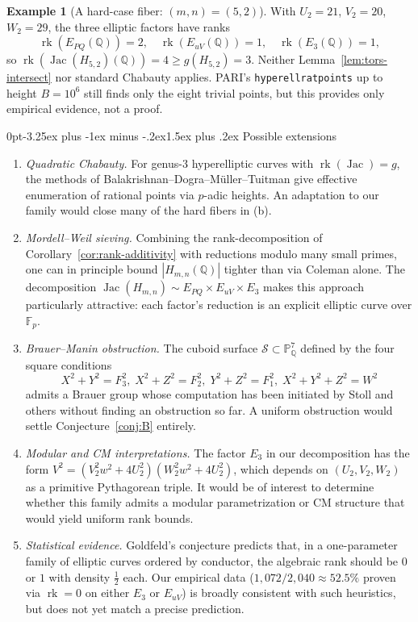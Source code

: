 \documentclass[12pt,a4paper,reqno]{amsart}
\makeatletter
\renewcommand{\subsection}{\@startsection{subsection}{2}%
  {0pt}{-3.25ex plus -1ex minus -.2ex}{1.5ex plus .2ex}%
  {\normalfont\normalsize\bfseries}}
\theoremstyle{plain}
\theoremstyle{definition}
\newtheorem{example}[theorem]{Example}
\theoremstyle{remark}
\newcommand{\Q}{\mathbb{Q}}
\newcommand{\F}{\mathbb{F}}
\newcommand{\HC}{H_{m,n}}
\newcommand{\Jac}{\operatorname{Jac}}
\newcommand{\rk}{\operatorname{rk}}
\makeatother
\begin{document}
\begin{example}[A hard-case fiber: $(m, n) = (5, 2)$]
\label{ex:hard52}
With $U_2 = 21$, $V_2 = 20$, $W_2 = 29$, the three elliptic factors have ranks
$$
\rk(E_{PQ}(\Q)) = 2, \quad \rk(E_{uV}(\Q)) = 1, \quad \rk(E_3(\Q)) = 1,
$$
so $\rk(\Jac(H_{5,2})(\Q)) = 4 \ge g(H_{5,2}) = 3$. Neither Lemma~\ref{lem:tors-intersect} nor standard Chabauty applies. PARI's \texttt{hyperellratpoints} up to height $B = 10^6$ still finds only the eight trivial points, but this provides only empirical evidence, not a proof.
\end{example}

\subsection{Possible extensions}

\begin{enumerate}[label=(\roman*),leftmargin=2em]
\item \emph{Quadratic Chabauty.} For genus-$3$ hyperelliptic curves with $\rk(\Jac) = g$, the methods of Balakrishnan--Dogra--M\"uller--Tuitman \cite{balakrishnan-dogra-mueller-tuitman} give effective enumeration of rational points via $p$-adic heights. An adaptation to our family would close many of the hard fibers in (b).

\item \emph{Mordell--Weil sieving.} Combining the rank-decomposition of Corollary~\ref{cor:rank-additivity} with reductions modulo many small primes, one can in principle bound $|\HC(\Q)|$ tighter than via Coleman alone. The decomposition $\Jac(\HC) \sim E_{PQ} \times E_{uV} \times E_3$ makes this approach particularly attractive: each factor's reduction is an explicit elliptic curve over $\F_p$.

\item \emph{Brauer--Manin obstruction.} The cuboid surface $\mathcal{S} \subset \mathbb{P}^7_\Q$ defined by the four square conditions
$$
X^2 + Y^2 = F_3^2, \; X^2 + Z^2 = F_2^2, \; Y^2 + Z^2 = F_1^2, \; X^2 + Y^2 + Z^2 = W^2
$$
admits a Brauer group whose computation has been initiated by Stoll and others without finding an obstruction so far. A uniform obstruction would settle Conjecture~\ref{conj:B} entirely.

\item \emph{Modular and CM interpretations.} The factor $E_3$ in our decomposition has the form $V^2 = (V_2^2 w^2 + 4 U_2^2)(W_2^2 w^2 + 4 U_2^2)$, which depends on $(U_2, V_2, W_2)$ as a primitive Pythagorean triple. It would be of interest to determine whether this family admits a modular parametrization or CM structure that would yield uniform rank bounds.

\item \emph{Statistical evidence.} Goldfeld's conjecture \cite{goldfeld} predicts that, in a one-parameter family of elliptic curves ordered by conductor, the algebraic rank should be $0$ or $1$ with density $\tfrac12$ each. Our empirical data ($1{,}072 / 2{,}040 \approx 52.5\%$ proven via $\rk = 0$ on either $E_3$ or $E_{uV}$) is broadly consistent with such heuristics, but does not yet match a precise prediction.
\end{enumerate}
\end{document}
